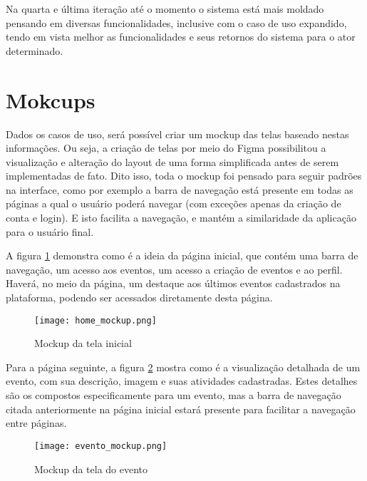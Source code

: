 Na quarta e última iteração até o momento o sistema está mais moldado pensando em diversas funcionalidades, inclusive com o caso de uso expandido, tendo em vista melhor as funcionalidades e seus retornos do sistema para o ator determinado.

\section{Mokcups}
Dados os casos de uso, será possível criar um mockup das telas baseado nestas informações. Ou seja, a criação de telas por meio do Figma possibilitou a visualização e alteração do layout de uma forma simplificada antes de serem implementadas de fato. Dito isso, toda o mockup foi pensado para seguir padrões na interface, como por exemplo a barra de navegação está presente em todas as páginas a qual o usuário poderá navegar (com exceções apenas da criação de conta e login). E isto facilita a navegação, e mantém a similaridade da aplicação para o usuário final.  

A figura \ref{home_mockup} demonstra como é a ideia da página inicial, que contém uma barra de navegação, um acesso aos eventos, um acesso a criação de eventos e ao perfil. Haverá, no meio da página, um destaque aos últimos eventos cadastrados na plataforma, podendo ser acessados diretamente desta página.
\begin{figure}[h]
    \caption{\label{home_mockup}Mockup da tela inicial}
    \vspace{5pt}
    \centering
    \texttt{[image: home\_mockup.png]}
    \vspace{5pt}
\end{figure}

Para a página seguinte, a figura \ref{evento_mockup} mostra como é a visualização detalhada de um evento, com sua descrição, imagem e suas atividades cadastradas. Estes detalhes são os compostos especificamente para um evento, mas a barra de navegação citada anteriormente na página inicial estará presente para facilitar a navegação entre páginas.
\begin{figure}[h]
    \caption{\label{evento_mockup}Mockup da tela do evento}
    \vspace{5pt}
    \centering
    \texttt{[image: evento\_mockup.png]}
    \vspace{5pt}
\end{figure}

